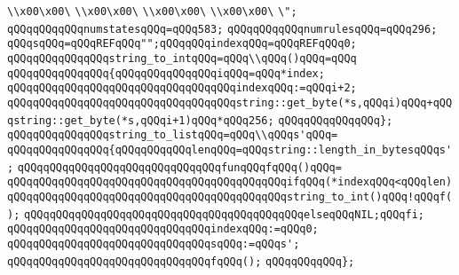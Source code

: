 \verb|\\x00\x00\|\newline
\verb|\\x00\x00\|\newline
\verb|\\x00\x00\|\newline
\verb|\\x00\x00\|\newline
\verb|\";|\newline
\verb|qQQqqQQqqQQqnumstatesqQQq=qQQq583;|\newline
\verb|qQQqqQQqqQQqnumrulesqQQq=qQQq296;|\newline
\verb|qQQqsqQQq=qQQqREFqQQq"";qQQqqQQqindexqQQq=qQQqREFqQQq0;|\newline
\verb|qQQqqQQqqQQqqQQqstring_to_intqQQq=qQQq\\qQQq()qQQq=qQQq|\newline
\verb|qQQqqQQqqQQqqQQq{qQQqqQQqqQQqqQQqiqQQq=qQQq*index;|\newline
\verb|qQQqqQQqqQQqqQQqqQQqqQQqqQQqqQQqqQQqindexqQQq:=qQQqi+2;|\newline
\verb|qQQqqQQqqQQqqQQqqQQqqQQqqQQqqQQqqQQqstring::get_byte(*s,qQQqi)qQQq+qQQqstring::get_byte(*s,qQQqi+1)qQQq*qQQq256;|\newline
\verb|qQQqqQQqqQQqqQQq};|\newline
\newline
\verb|qQQqqQQqqQQqqQQqstring_to_listqQQq=qQQq\\qQQqs'qQQq=|\newline
\verb|qQQqqQQqqQQqqQQq{qQQqqQQqqQQqlenqQQq=qQQqstring::length_in_bytesqQQqs';|\newline
\verb|qQQqqQQqqQQqqQQqqQQqqQQqqQQqqQQqfunqQQqfqQQq()qQQq=|\newline
\verb|qQQqqQQqqQQqqQQqqQQqqQQqqQQqqQQqqQQqqQQqqQQqifqQQq(*indexqQQq<qQQqlen)|\newline
\verb|qQQqqQQqqQQqqQQqqQQqqQQqqQQqqQQqqQQqqQQqqQQqstring_to_int()qQQq!qQQqf();|\newline
\verb|qQQqqQQqqQQqqQQqqQQqqQQqqQQqqQQqqQQqqQQqqQQqelseqQQqNIL;qQQqfi;|\newline
\verb|qQQqqQQqqQQqqQQqqQQqqQQqqQQqqQQqindexqQQq:=qQQq0;|\newline
\verb|qQQqqQQqqQQqqQQqqQQqqQQqqQQqqQQqsqQQq:=qQQqs';|\newline
\verb|qQQqqQQqqQQqqQQqqQQqqQQqqQQqqQQqfqQQq();|\newline
\verb|qQQqqQQqqQQq};|\newline
\newline
